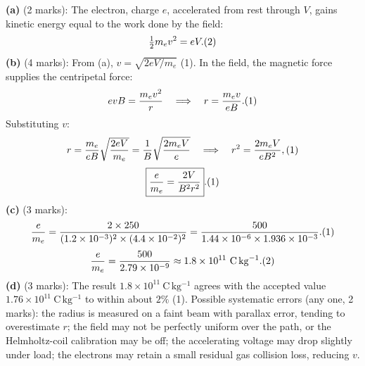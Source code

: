 \documentclass[11pt]{article}
\begin{document}
\begin{corrige}
\textbf{(a)} (2 marks): The electron, charge $e$, accelerated from rest through $V$, gains kinetic energy equal to the work done by the field:
\[ \tfrac{1}{2} m_e v^2 = eV. \hfill (2) \]
\textbf{(b)} (4 marks): From (a), $v = \sqrt{2eV/m_e}$ \hfill (1). In the field, the magnetic force supplies the centripetal force:
\[ e v B = \frac{m_e v^2}{r} \quad\Longrightarrow\quad r = \frac{m_e v}{e B}. \hfill (1) \]
Substituting $v$:
\[ r = \frac{m_e}{eB}\sqrt{\frac{2eV}{m_e}} = \frac{1}{B}\sqrt{\frac{2 m_e V}{e}} \quad\Longrightarrow\quad r^2 = \frac{2 m_e V}{e B^2}, \hfill (1) \]
\[ \boxed{\frac{e}{m_e} = \frac{2V}{B^2 r^2}}. \hfill (1) \]
\textbf{(c)} (3 marks):
\[ \frac{e}{m_e} = \frac{2 \times 250}{(1.2 \times 10^{-3})^2 \times (4.4 \times 10^{-2})^2} = \frac{500}{1.44 \times 10^{-6} \times 1.936 \times 10^{-3}}. \hfill (1) \]
\[ \frac{e}{m_e} = \frac{500}{2.79 \times 10^{-9}} \approx 1.8 \times 10^{11}\ \mathrm{C\,kg^{-1}}. \hfill (2) \]
\textbf{(d)} (3 marks): The result $1.8 \times 10^{11}\ \mathrm{C\,kg^{-1}}$ agrees with the accepted value $1.76 \times 10^{11}\ \mathrm{C\,kg^{-1}}$ to within about $2\%$ \hfill (1). Possible systematic errors (any one, 2 marks): the radius is measured on a faint beam with parallax error, tending to overestimate $r$; the field may not be perfectly uniform over the path, or the Helmholtz-coil calibration may be off; the accelerating voltage may drop slightly under load; the electrons may retain a small residual gas collision loss, reducing $v$.
\end{corrige}
\end{document}
